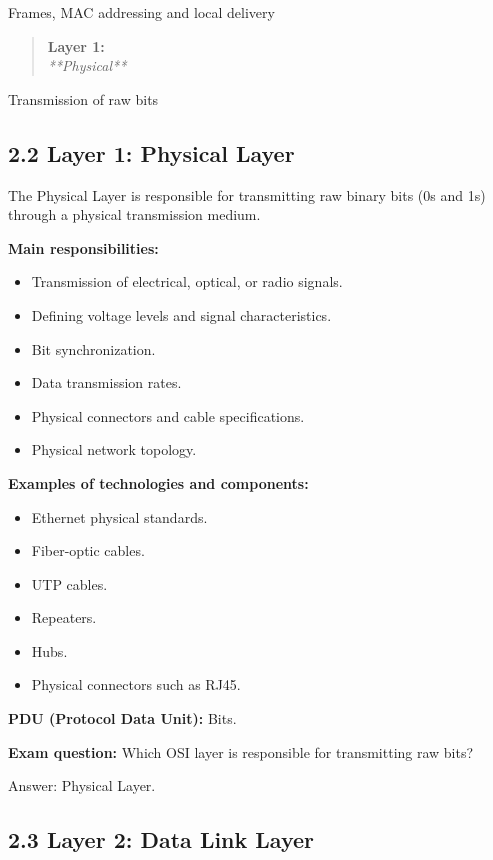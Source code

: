 Frames, MAC addressing and local delivery

\begin{quote}
\textbf{Layer 1: }\\[2pt]
\textit{**Physical**}
\end{quote}

Transmission of raw bits

\subsection{2.2 Layer 1: Physical Layer}

The Physical Layer is responsible for transmitting raw binary bits (0s and 1s) through a physical transmission medium.

\textbf{Main responsibilities:}

\begin{itemize}
    \item Transmission of electrical, optical, or radio signals.
    \item Defining voltage levels and signal characteristics.
    \item Bit synchronization.
    \item Data transmission rates.
    \item Physical connectors and cable specifications.
    \item Physical network topology.
\end{itemize}

\textbf{Examples of technologies and components:}

\begin{itemize}
    \item Ethernet physical standards.
    \item Fiber-optic cables.
    \item UTP cables.
    \item Repeaters.
    \item Hubs.
    \item Physical connectors such as RJ45.
\end{itemize}

\textbf{PDU (Protocol Data Unit):} Bits.

\textbf{Exam question:} Which OSI layer is responsible for transmitting raw bits?

Answer: Physical Layer.

\subsection{2.3 Layer 2: Data Link Layer}

